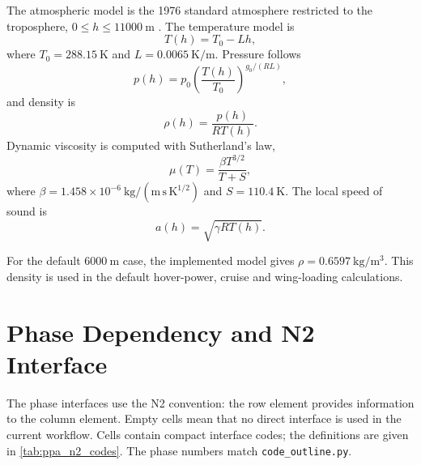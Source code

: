 The atmospheric model is the 1976 standard atmosphere restricted to the troposphere, \(0 \leq h \leq 11000~\mathrm{m}\) \cite{NOAA1976U.S.1976}. The temperature model is
\begin{equation}
    T(h) = T_0 - Lh ,
    \label{eq:ppa_isa_temp}
\end{equation}
where \(T_0=288.15~\mathrm{K}\) and \(L=0.0065~\mathrm{K/m}\). Pressure follows
\begin{equation}
    p(h) = p_0 \left(\frac{T(h)}{T_0}\right)^{g_0/(RL)} ,
    \label{eq:ppa_isa_pressure}
\end{equation}
and density is
\begin{equation}
    \rho(h) = \frac{p(h)}{R T(h)} .
    \label{eq:ppa_isa_density}
\end{equation}
Dynamic viscosity is computed with Sutherland's law,
\begin{equation}
    \mu(T) = \frac{\beta T^{3/2}}{T+S} ,
    \label{eq:ppa_sutherland}
\end{equation}
where \(\beta=1.458\times10^{-6}~\mathrm{kg/(m\,s\,K^{1/2})}\) and \(S=110.4~\mathrm{K}\). The local speed of sound is
\begin{equation}
    a(h)=\sqrt{\gamma R T(h)} .
    \label{eq:ppa_speed_sound}
\end{equation}

For the default \(6000~\mathrm{m}\) case, the implemented model gives \(\rho=0.6597~\mathrm{kg/m^3}\). This density is used in the default hover-power, cruise and wing-loading calculations.

\section{Phase Dependency and N2 Interface}
\label{sec:ppa_n2}

The phase interfaces use the N2 convention: the row element provides information to the column element. Empty cells mean that no direct interface is used in the current workflow. Cells contain compact interface codes; the definitions are given in \autoref{tab:ppa_n2_codes}. The phase numbers match \texttt{code\_outline.py}.

